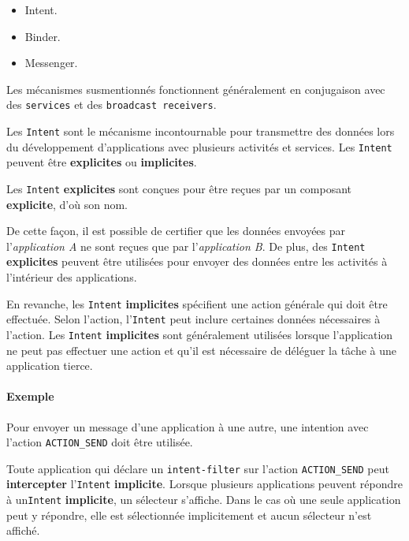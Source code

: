 \documentclass[
  french,
  paper=a4,
  ,captions=tableheading
]{scrartcl}
\providecommand{\tightlist}{%
  \setlength{\itemsep}{0pt}\setlength{\parskip}{0pt}}
\begin{document}
\begin{itemize}
\tightlist
\item
  Intent.
\item
  Binder.
\item
  Messenger.
\end{itemize}

Les mécanismes susmentionnés fonctionnent généralement en conjugaison
avec des \texttt{services} et des \texttt{broadcast\ receivers}.

Les \texttt{Intent} sont le mécanisme incontournable pour transmettre
des données lors du développement d'applications avec plusieurs
activités et services. Les \texttt{Intent} peuvent être
\textbf{explicites} ou \textbf{implicites}.

Les \texttt{Intent} \textbf{explicites} sont conçues pour être reçues
par un composant \textbf{explicite}, d'où son nom.

De cette façon, il est possible de certifier que les données envoyées
par l'\emph{application A} ne sont reçues que par l'\emph{application
B}. De plus, des \texttt{Intent} \textbf{explicites} peuvent être
utilisées pour envoyer des données entre les activités à l'intérieur des
applications.

En revanche, les \texttt{Intent} \textbf{implicites} spécifient une
action générale qui doit être effectuée. Selon l'action, l'\texttt{Intent} peut
inclure certaines données nécessaires à l'action. Les \texttt{Intent}
\textbf{implicites} sont généralement utilisées lorsque l'application ne
peut pas effectuer une action et qu'il est nécessaire de déléguer la
tâche à une application tierce.

\hypertarget{exemple}{%
\paragraph{Exemple}\label{exemple}}

\begin{flushleft}
Pour envoyer un message d'une application à une autre, une intention
avec l'action \texttt{ACTION\_SEND} doit être utilisée.
\end{flushleft}

Toute application qui déclare un \texttt{intent-filter} sur l'action
\texttt{ACTION\_SEND} peut \textbf{intercepter} l'\texttt{Intent}
\textbf{implicite}. Lorsque plusieurs applications peuvent répondre à
un\texttt{Intent} \textbf{implicite}, un sélecteur s'affiche. Dans le
cas où une seule application peut y répondre, elle est sélectionnée
implicitement et aucun sélecteur n'est affiché.
\end{document}
